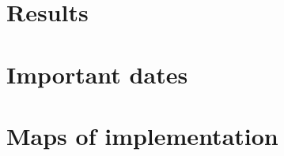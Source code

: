 \documentclass[10pt]{article}
\begin{document}
\pagebreak

\clearpage\section{Results}














\appendix

\clearpage\section{Important dates}\label{sec:dates}



\section{Maps of implementation}
\end{document}
